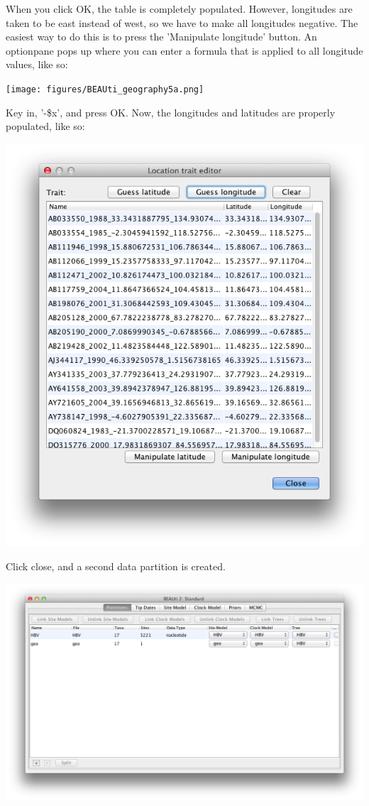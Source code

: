 \documentclass{article}
\begin{document}
When you click OK, the table is completely populated. However, longitudes are taken to be 
east instead of west, so we have to make all longitudes negative. The easiest way to do this
is to press the 'Manipulate longitude' button. An optionpane pops up where you can enter
a formula that is applied to all longitude values, like so:

\texttt{[image: figures/BEAUti\_geography5a.png]}

Key in, '-\$x', and press OK. Now, the longitudes and latitudes are properly populated, like so:

\includegraphics[scale=0.4]{figures/BEAUti_geography6.png}

Click close, and a second data partition is created.

\includegraphics[scale=0.4]{figures/BEAUti_DataPartitions2.png}
\end{document}
